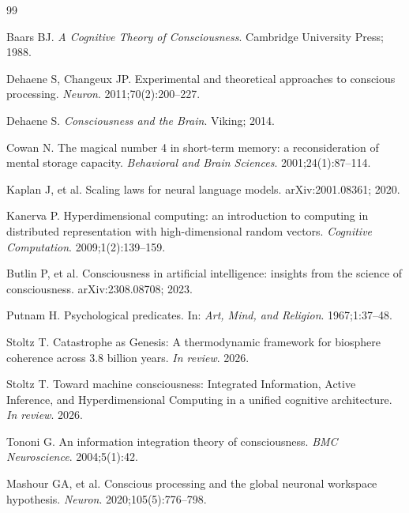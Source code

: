 \documentclass[10pt,letterpaper]{article}
\begin{document}
\begin{thebibliography}{99}

Baars BJ. \emph{A Cognitive Theory of Consciousness}. Cambridge University Press; 1988.

Dehaene S, Changeux JP. Experimental and theoretical approaches to
conscious processing. \emph{Neuron}. 2011;70(2):200--227.

Dehaene S. \emph{Consciousness and the Brain}. Viking; 2014.

Cowan N. The magical number 4 in short-term memory: a reconsideration
of mental storage capacity. \emph{Behavioral and Brain Sciences}.
2001;24(1):87--114.

Kaplan J, et al. Scaling laws for neural language models. arXiv:2001.08361; 2020.

Kanerva P. Hyperdimensional computing: an introduction to computing in
distributed representation with high-dimensional random vectors.
\emph{Cognitive Computation}. 2009;1(2):139--159.

Butlin P, et al. Consciousness in artificial intelligence: insights from
the science of consciousness. arXiv:2308.08708; 2023.

Putnam H. Psychological predicates. In: \emph{Art, Mind, and Religion}. 1967;1:37--48.

Stoltz T. Catastrophe as Genesis: A thermodynamic framework for
biosphere coherence across 3.8 billion years. \emph{In review}. 2026.

Stoltz T. Toward machine consciousness: Integrated Information, Active
Inference, and Hyperdimensional Computing in a unified cognitive architecture.
\emph{In review}. 2026.

Tononi G. An information integration theory of consciousness.
\emph{BMC Neuroscience}. 2004;5(1):42.

Mashour GA, et al. Conscious processing and the global neuronal workspace
hypothesis. \emph{Neuron}. 2020;105(5):776--798.

\end{thebibliography}
\end{document}
